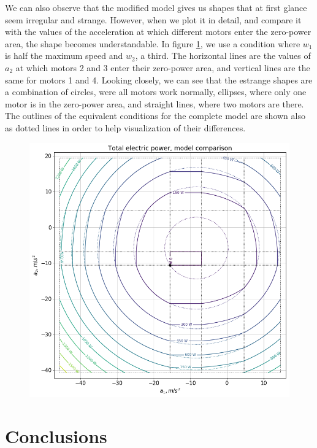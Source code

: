 \documentclass[12pt]{article}
\begin{document}
We can also observe that the modified model gives us shapes that at first glance seem irregular and strange. However, when we plot it in detail, and compare it with the values of the acceleration at which different motors enter the zero-power area, the shape becomes understandable. In figure \ref{fig:comparacion_modelos}, we use a condition where $w_1$ is half the maximum speed and $w_2$, a third. The horizontal lines are the values of $a_2$ at which motors 2 and 3 enter their zero-power area, and vertical lines are the same for motors 1 and 4. Looking closely, we can see that the estrange shapes are a combination of circles, were all motors work normally, ellipses, where only one motor is in the zero-power area, and straight lines, where two motors are there. The outlines of the equivalent conditions for the complete model are shown also as dotted lines in order to help visualization of their differences.

\begin{figure}[h]
	\centering
	\includegraphics[width=1\linewidth]{comparacion_modelos}
	\label{fig:comparacion_modelos}
\end{figure}

\section{Conclusions}
\end{document}
